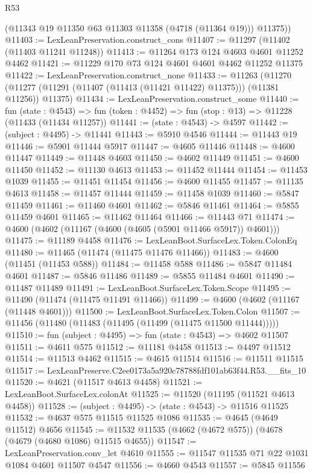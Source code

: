 \begin{lexlean}{R53}
\begin{coremodule}
        (@11343 @19 @11350 @63 @11303 @11358 (@4718 (@11364 @19)))
        @11375))
@11403 := LexLeanPreservation.construct_cons
@11407 := @11297 (@11402 (@11403 @11241 @11248))
@11413 := @11264 @173 @124 @4603 @4601 @11252 @4462
@11421 := @11229 @170 @73 @124 @4601 @4601 @4462 @11252 @11375
@11422 := LexLeanPreservation.construct_none
@11433 := @11263
    (@11270 (@11277 (@11291 (@11407 (@11413 (@11421 @11422) @11375))) (@11381 @11256)) @11375)
@11434 := LexLeanPreservation.construct_some
@11440 := fun (state : @4543) =>
  fun (token : @4452) => fun (stop : @13) => @11228 (@11433 (@11434 @11257))
@11441 := (state : @4543) -> @4597
@11442 := (subject : @4495) -> @11441
@11443 := @5910 @4546
@11444 := @11443 @19
@11446 := @5901 @11444 @5917
@11447 := @4605 @11446
@11448 := @4600 @11447
@11449 := @11448 @4603
@11450 := @4602 @11449
@11451 := @4600 @11450
@11452 := @11130 @4613
@11453 := @11452 @11444
@11454 := @11453 @1039
@11455 := @11451 @11454
@11456 := @4600 @11455
@11457 := @11135 @4613
@11458 := @11457 @11444
@11459 := @11458 @1039
@11460 := @5847 @11459
@11461 := @11460 @4601
@11462 := @5846 @11461
@11464 := @5855 @11459 @4601
@11465 := @11462 @11464
@11466 := @11443 @71
@11474 := @4600 (@4602 (@11167 (@4600 (@4605 (@5901 @11466 @5917)) @4601)))
@11475 := @11189 @4458
@11476 := LexLeanBoot.SurfaceLex.Token.ColonEq
@11480 := @11465 (@11474 (@11475 @11476 @11466))
@11483 := @4600 (@11451 (@11453 @588))
@11484 := @11458 @588
@11486 := @5847 @11484 @4601
@11487 := @5846 @11486
@11489 := @5855 @11484 @4601
@11490 := @11487 @11489
@11491 := LexLeanBoot.SurfaceLex.Token.Scope
@11495 := @11490 (@11474 (@11475 @11491 @11466))
@11499 := @4600 (@4602 (@11167 (@11448 @4601)))
@11500 := LexLeanBoot.SurfaceLex.Token.Colon
@11507 := @11456 (@11480 (@11483 (@11495 (@11499 (@11475 @11500 @11444)))))
@11510 := fun (subject : @4495) => fun (state : @4543) => @4602 @11507
@11511 := @4611 @575
@11512 := @11181 @4458
@11513 := @4497 @11512
@11514 := @11513 @4462
@11515 := @4615 @11514
@11516 := @11511 @11515
@11517 := LexLeanPreserve.C2ee0173a5a920c78788fdf101ab63f44.R53.__fits_10
@11520 := @4621 (@11517 @4613 @4458)
@11521 := LexLeanBoot.SurfaceLex.colonAt
@11525 := @11520 (@11195 (@11521 @4613 @4458))
@11528 := (subject : @4495) -> (state : @4543) -> @11516 @11525
@11532 := @4637 @575 @11515 @11525 @1086
@11535 := @4645 (@4649 @11512) @4656
@11545 := @11532 @11535 (@4662 (@4672 @575)) (@4678 (@4679 (@4680 @1086) @11515 @4655))
@11547 := LexLeanPreservation.conv_let @4610
@11555 := @11547 @11535 @71 @22 @1031 @1084 @4601 @11507 @4547
@11556 := @4660 @4543
@11557 := @5845 @11556

\end{coremodule}
\end{lexlean}
